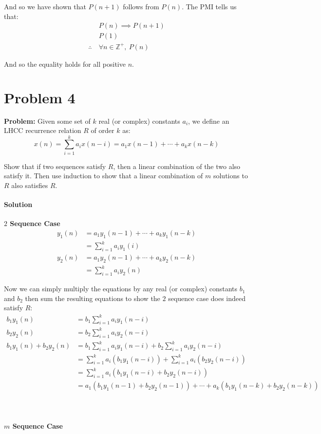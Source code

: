 \documentclass{article}
\begin{document}
And so we have shown that $P(n+1)$ follows from $P(n)$. The PMI tells us that:
\begin{align*}
&P(n)\implies P(n+1)\\
&P(1)\\
\therefore\ &{\forall n\in \mathbb{Z}^+,\ P(n)}
\end{align*}

And so the equality holds for all positive $n$.

\section*{Problem 4}
\textbf{Problem:} Given some set of $k$ real (or complex) constants $a_i$, we define an LHCC recurrence relation $R$ of order $k$ as:
$$x(n)=\sum_{i=1}^ka_ix(n-i)=a_1x(n-1)+\cdots+a_kx(n-k)$$

Show that if two sequences satisfy $R$, then a linear combination of the two also satisfy it. Then use induction to show that a linear combination of $m$ solutions to $R$ also satisfies $R$.
\\\\
\textbf{Solution}
\\\\
\textbf{$2$ Sequence Case}
\begin{align*}
  y_1(n)&=a_1y_1(n-1)+\cdots+a_ky_1(n-k)\tag{given}\\
  &=\sum_{i=1}^ka_iy_1(i)\\
  y_2(n)&=a_1y_2(n-1)+\cdots+a_ky_2(n-k)\tag{given}\\
  &=\sum_{i=1}^ka_iy_2(n)
\end{align*}

Now we can simply multiply the equations by any real (or complex) constants $b_1$ and $b_2$ then sum the resulting equations to show the $2$ sequence case does indeed satisfy $R$:
\begin{align*}
  b_1y_1(n)&=b_1\sum_{i=1}^ka_iy_1(n-i)\\
  b_2y_2(n)&=b_2\sum_{i=1}^ka_iy_2(n-i)\\
  b_1y_1(n)+b_2y_2(n)&=b_1\sum_{i=1}^ka_iy_1(n-i)+b_2\sum_{i=1}^{k}a_iy_2(n-i)\\
  &=\sum_{i=1}^ka_i(b_1y_1(n-i))+\sum_{i=1}^ka_i(b_2y_2(n-i))\tag{finitary distrib. prop.}\\
  &=\sum_{i=1}^ka_i(b_1y_1(n-i)+b_2y_2(n-i))\tag{finitary distrib. prop.}\\
  &=a_1(b_1y_1(n-1)+b_2y_2(n-1))+\cdots+a_k(b_1y_1(n-k)+b_2y_2(n-k))
\end{align*}
\\\\\\
\textbf{$m$ Sequence Case}
\end{document}
